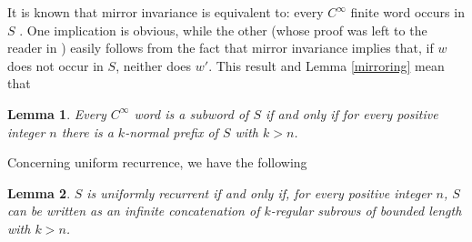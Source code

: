 \documentclass[10pt,a4paper]{article}
\newtheorem{lemma}{Lemma}
\begin{document}
 It is known that mirror invariance is equivalent to: every $C^{\infty}$ finite word occurs in $S$ \cite{dekking1997long}. One implication is obvious, while the other (whose proof was left to the reader in \cite{dekking1997long}) easily follows from the fact that mirror invariance implies that, if $w$ does not occur in $S$, neither does $w'$. This result and Lemma \ref{mirroring} mean that
\begin{lemma}
Every $C^{\infty}$ word is a subword of $S$ if and only if for every positive integer $n$ there is a $k$-normal prefix of $S$ with $k>n$.
\label{subwords}
\end{lemma}

 Concerning uniform recurrence, we have the following
\begin{lemma}
$S$ is uniformly recurrent if and only if, for every positive integer $n$, $S$ can be written as an infinite concatenation of $k$-regular subrows of bounded length with $k>n$.
\label{uniformly}
\end{lemma}
\end{document}
